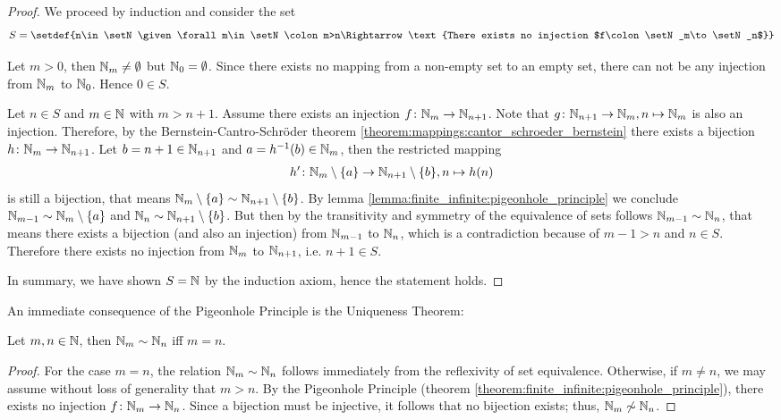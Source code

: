 \begin{proof}
    We proceed by induction and consider the set
    \begin{align}S=\setdef{n\in\setN\given \forall m\in\setN\colon m>n\Rightarrow \text{There exists no injection $f\colon\setN_m\to\setN_n$}}\end{align}
    
     Let $m>0$, then $\mathbb{N}_m\neq\emptyset$ but $\mathbb{N}_0=\emptyset$. Since there exists no mapping from a non-empty set to an empty set, there can not be any injection from $\mathbb{N}_m$ to $\mathbb{N}_0$. Hence $0\in S$.

     Let $n\in S$ and $m\in\mathbb{N}$ with $m>n+1$. Assume there exists an injection $f\colon \mathbb{N}_m\to\mathbb{N}_{n+1}$. Note that $g\colon\mathbb{N}_{n+1}\to\mathbb{N}_m, n\mapsto\mathbb{N}_m$ is also an injection. Therefore, by the Bernstein-Cantro-Schröder theorem \ref{theorem:mappings:cantor_schroeder_bernstein} there exists a bijection $h\colon\mathbb{N}_m\to\mathbb{N}_{n+1}$. Let $b=n+1\in\mathbb{N}_{n+1}$ and $a=h^{-1}(b)\in\mathbb{N}_m$, then the restricted mapping \begin{align}h'\colon\mathbb{N}_m\setminus\{a\}\to\mathbb{N}_{n+1}\setminus\{b\}, n\mapsto h(n)\end{align}
    is still a bijection, that means $\mathbb{N}_m\setminus\{a\}\sim\mathbb{N}_{n+1}\setminus\{b\}$. By lemma \ref{lemma:finite_infinite:pigeonhole_principle} we conclude $\mathbb{N}_{m-1}\sim\mathbb{N}_m\setminus\{a\}$ and $\mathbb{N}_n\sim\mathbb{N}_{n+1}\setminus\{b\}$. But then by the transitivity and symmetry of the equivalence of sets follows $\mathbb{N}_{m-1}\sim\mathbb{N}_n$, that means there exists a bijection (and also an injection) from $\mathbb{N}_{m-1}$ to $\mathbb{N}_n$, which is a contradiction because of $m-1>n$ and $n\in S$. Therefore there exists no injection from $\mathbb{N}_m$ to $\mathbb{N}_{n+1}$, i.e. $n+1\in S$.

    In summary, we have shown $S=\mathbb{N}$ by the induction axiom, hence the statement holds.
\end{proof}

An immediate consequence of the Pigeonhole Principle is the Uniqueness Theorem:

\begin{theorem}\label{theorem:finite_infinite:uniqueness}
    Let $m,n\in\mathbb{N}$, then $\mathbb{N}_m\sim\mathbb{N}_n$ iff $m=n$.
\end{theorem}
\begin{proof}
    For the case $m = n$, the relation $\mathbb{N}_m \sim \mathbb{N}_n$ follows immediately from the reflexivity of set equivalence. Otherwise, if $m \neq n$, we may assume without loss of generality that $m > n$. By the Pigeonhole Principle (theorem \ref{theorem:finite_infinite:pigeonhole_principle}), there exists no injection $f\colon \mathbb{N}_m \to \mathbb{N}_n$. Since a bijection must be injective, it follows that no bijection exists; thus, $\mathbb{N}_m \not\sim \mathbb{N}_n$.
\end{proof}

